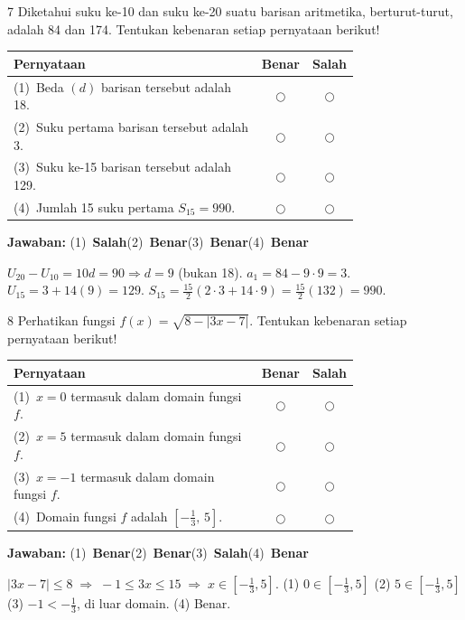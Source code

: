 \documentclass[11pt]{article}
\newcommand{\jawaban}[1]{%
  \noindent\colorbox{gold!30}{\parbox{\dimexpr\linewidth-2\fboxsep\relax}{%
    \textbf{Jawaban:} #1}}\par\smallskip}
\begin{document}
\begin{soal}{7}
Diketahui suku ke-10 dan suku ke-20 suatu barisan aritmetika,
berturut-turut, adalah 84 dan 174.
Tentukan kebenaran setiap pernyataan berikut!

\par\smallskip
{\renewcommand{\arraystretch}{1.4}%
\begin{tabular}{@{}p{0.76\linewidth}cc@{}}
\hline
\textbf{Pernyataan} & \textbf{Benar} & \textbf{Salah}\\
\hline
(1)~Beda $(d)$ barisan tersebut adalah 18.
  & $\bigcirc$ & $\bigcirc$\\
(2)~Suku pertama barisan tersebut adalah 3.
  & $\bigcirc$ & $\bigcirc$\\
(3)~Suku ke-15 barisan tersebut adalah 129.
  & $\bigcirc$ & $\bigcirc$\\
(4)~Jumlah 15 suku pertama $S_{15}=990$.
  & $\bigcirc$ & $\bigcirc$\\
\hline
\end{tabular}}
\end{soal}
\begin{pembox}
\jawaban{(1)~\textbf{Salah}\quad(2)~\textbf{Benar}\quad(3)~\textbf{Benar}\quad(4)~\textbf{Benar}}
$U_{20}-U_{10}=10d=90\Rightarrow d=9$ (bukan 18).
$a_1=84-9\cdot9=3$.
$U_{15}=3+14(9)=129$.
$S_{15}=\tfrac{15}{2}(2\cdot3+14\cdot9)=\tfrac{15}{2}(132)=990$.
\end{pembox}

\begin{soal}{8}
Perhatikan fungsi $f(x)=\sqrt{8-|3x-7|}$.
Tentukan kebenaran setiap pernyataan berikut!

\par\smallskip
{\renewcommand{\arraystretch}{1.4}%
\begin{tabular}{@{}p{0.76\linewidth}cc@{}}
\hline
\textbf{Pernyataan} & \textbf{Benar} & \textbf{Salah}\\
\hline
(1)~$x=0$ termasuk dalam domain fungsi $f$.
  & $\bigcirc$ & $\bigcirc$\\
(2)~$x=5$ termasuk dalam domain fungsi $f$.
  & $\bigcirc$ & $\bigcirc$\\
(3)~$x=-1$ termasuk dalam domain fungsi $f$.
  & $\bigcirc$ & $\bigcirc$\\
(4)~Domain fungsi $f$ adalah $\left[-\tfrac{1}{3},\,5\right]$.
  & $\bigcirc$ & $\bigcirc$\\
\hline
\end{tabular}}
\end{soal}
\begin{pembox}
\jawaban{(1)~\textbf{Benar}\quad(2)~\textbf{Benar}\quad(3)~\textbf{Salah}\quad(4)~\textbf{Benar}}
$|3x-7|\leq8\;\Rightarrow\;-1\leq3x\leq15\;\Rightarrow\;x\in\!\left[-\tfrac{1}{3},5\right]$.
(1) $0\in[-\tfrac{1}{3},5]$\;\checkmark\quad
(2) $5\in[-\tfrac{1}{3},5]$\;\checkmark\quad
(3) $-1<-\tfrac{1}{3}$, di luar domain.\quad
(4) Benar.
\end{pembox}
\end{document}
